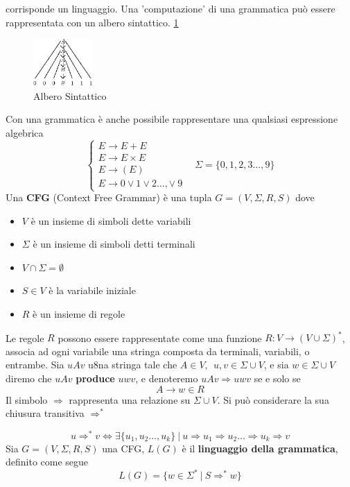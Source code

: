 \documentclass[10pt, letterpaper]{report}
\begin{document}
corrisponde un linguaggio. Una 'computazione' di una grammatica può 
essere rappresentata con un albero sintattico. \ref{fig:alsint}\acc
\begin{figure}[h!]
    \centering 
    \includegraphics[width=0.2\textwidth ]{images/alberoSintattico.eps}
    \caption{Albero Sintattico}
    \label{fig:alsint}
\end{figure}\acc
Con una grammatica è anche possibile rappresentare una qualsiasi 
espressione algebrica 
$$ 
\begin{cases}
    E \longrightarrow E + E \\ 
    E \longrightarrow  E \times E \\ 
    E \longrightarrow (E)\\ 
    E \longrightarrow 0 \lor 1 \lor 2 \dots, \lor \ 9 
\end{cases} \ \ \ \ \Sigma=\{0,1,2,3\dots,9\}
$$
 Una \textbf{CFG} (Context Free Grammar) 
è una tupla $G=(V,\Sigma, R, S)$ dove\begin{itemize}
    \item $V$ è un insieme di simboli dette variabili 
    \item $\Sigma$ è un insieme di simboli detti terminali 
    \item $V\cap \Sigma = \emptyset$
    \item $S\in V$ è la variabile iniziale 
    \item $R$ è un insieme di regole
\end{itemize}
Le regole $R$ possono essere rappresentate come una funzione 
$R : V \rightarrow (V\cup \Sigma)^*$, associa ad ogni variabile una 
stringa composta da terminali, variabili, o entrambe.\acc 
Sia $uAv$ u8na stringa tale che $A\in V, \ \ u,v\in \Sigma \cup V$, e sia 
$w\in \Sigma \cup V$ diremo che 
$uAv$ \textbf{produce} $uwv$, e denoteremo $uAv \Rightarrow  uwv$ se e solo se
 $$ A\longrightarrow w \in R$$
 Il simbolo $ \Rightarrow $ rappresenta una relazione su $\Sigma \cup V$.
 Si può considerare la sua chiusura transitiva $\Rightarrow^*$

 $$u\Rightarrow^* v \iff \exists \{u_1,u_2\dots,u_k\} \ | \  
 u\Rightarrow u_1 \Rightarrow u_2 \dots \Rightarrow u_k \Rightarrow v$$ 
Sia $G=(V,\Sigma, R, S)$ una CFG, $L(G)$ è il \textbf{linguaggio della grammatica}, 
definito come segue 
$$L(G)= \{w\in\Sigma^*\ | \ S\Rightarrow^* w\}$$
\end{document}
